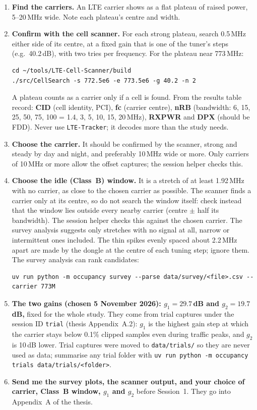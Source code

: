 \documentclass[11pt,a4paper]{article}
\newcommand{\cmd}[1]{\texttt{#1}}
\begin{document}
\begin{enumerate}
\item \textbf{Find the carriers.} An LTE carrier shows as a flat plateau of raised power, 5--20\,MHz wide. Note each plateau's centre and width.
\item \textbf{Confirm with the cell scanner.} For each strong plateau, search 0.5\,MHz either side of its centre, at a fixed gain that is one of the tuner's steps (e.g.\ 40.2\,dB), with two tries per frequency. For the plateau near 773\,MHz:
\begin{Verbatim}
cd ~/tools/LTE-Cell-Scanner/build
./src/CellSearch -s 772.5e6 -e 773.5e6 -g 40.2 -n 2
\end{Verbatim}
A plateau counts as a carrier only if a cell is found. From the results table record: \textbf{CID} (cell identity, PCI), \textbf{fc} (carrier centre), \textbf{nRB} (bandwidth: 6, 15, 25, 50, 75, 100 = 1.4, 3, 5, 10, 15, 20\,MHz), \textbf{RXPWR} and \textbf{DPX} (should be FDD). Never use \cmd{LTE-Tracker}; it decodes more than the study needs.
\item \textbf{Choose the carrier.} It should be confirmed by the scanner, strong and steady by day and night, and preferably 10\,MHz wide or more. Only carriers of 10\,MHz or more allow the offset captures; the session helper checks this.
\item \textbf{Choose the idle (Class~B) window.} It is a stretch of at least 1.92\,MHz with no carrier, as close to the chosen carrier as possible. The scanner finds a carrier only at its centre, so do not search the window itself: check instead that the window lies outside every nearby carrier (centre $\pm$ half its bandwidth). The session helper checks this against the chosen carrier. The survey analysis suggests only stretches with no signal at all, narrow or intermittent ones included. The thin spikes evenly spaced about 2.2\,MHz apart are made by the dongle at the centre of each tuning step; ignore them. The survey analysis can rank candidates:
\begin{Verbatim}
uv run python -m occupancy survey --parse data/survey/<file>.csv --carrier 773M
\end{Verbatim}
\item \textbf{The two gains (chosen 5 November 2026): $g_1 = 29.7$\,dB and $g_2 = 19.7$\,dB,} fixed for the whole study. They come from trial captures under the session ID \cmd{trial} (thesis Appendix~A.2): $g_1$ is the highest gain step at which the carrier stays below 0.1\% clipped samples even during traffic peaks, and $g_2$ is 10\,dB lower. Trial captures were moved to \cmd{data/trials/} so they are never used as data; summarise any trial folder with \cmd{uv run python -m occupancy trials data/trials/<folder>}.
\item \textbf{Send me the survey plots, the scanner output, and your choice of carrier, Class~B window, $g_1$ and $g_2$} before Session~1. They go into Appendix~A of the thesis.
\end{enumerate}
\end{document}
